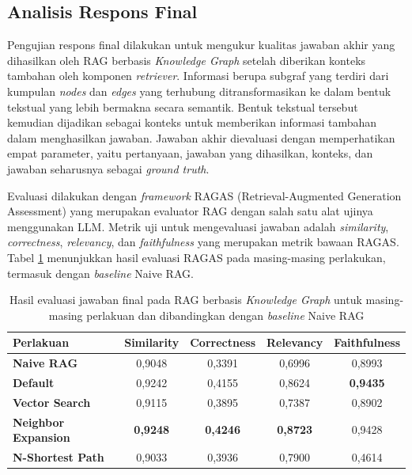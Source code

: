 \subsection{Analisis Respons Final}
Pengujian respons final dilakukan untuk mengukur kualitas jawaban akhir yang dihasilkan oleh RAG berbasis \textit{Knowledge Graph} setelah diberikan konteks tambahan oleh komponen \textit{retriever}.
Informasi berupa subgraf yang terdiri dari kumpulan \textit{nodes} dan \textit{edges} yang terhubung ditransformasikan ke dalam bentuk tekstual yang lebih bermakna secara semantik.
Bentuk tekstual tersebut kemudian dijadikan sebagai konteks untuk memberikan informasi tambahan dalam menghasilkan jawaban.
Jawaban akhir dievaluasi dengan memperhatikan empat parameter, yaitu pertanyaan, jawaban yang dihasilkan, konteks, dan jawaban seharusnya sebagai \textit{ground truth}.

Evaluasi dilakukan dengan \textit{framework} RAGAS (Retrieval-Augmented Generation Assessment) yang merupakan evaluator RAG dengan salah satu alat ujinya menggunakan LLM.
Metrik uji untuk mengevaluasi jawaban adalah \textit{similarity}, \textit{correctness}, \textit{relevancy}, dan \textit{faithfulness} yang merupakan metrik bawaan RAGAS.
Tabel \ref{tab:final-answer-evaluation-result} menunjukkan hasil evaluasi RAGAS pada masing-masing perlakukan, termasuk dengan \textit{baseline} Naive RAG.

\begin{table}[H]
	\centering
	\caption{Hasil evaluasi jawaban final pada RAG berbasis \textit{Knowledge Graph} untuk masing-masing perlakuan dan dibandingkan dengan \textit{baseline} Naive RAG}
	\label{tab:final-answer-evaluation-result}
	\begin{tabular}{|l|c|c|c|c|}
		\hline
		\textbf{Perlakuan}          & \textbf{Similarity} & \textbf{Correctness} & \textbf{Relevancy} & \textbf{Faithfulness} \\
		\hline \hline
		\textbf{Naive RAG}          & 0,9048              & 0,3391               & 0,6996             & 0,8993                \\
		\hline
		\textbf{Default}            & 0,9242              & 0,4155               & 0,8624             & \textbf{0,9435}       \\
		\hline
		\textbf{Vector Search}      & 0,9115              & 0,3895               & 0,7387             & 0,8902                \\
		\hline
		\textbf{Neighbor Expansion} & \textbf{0,9248}     & \textbf{0,4246}      & \textbf{0,8723}    & 0,9428                \\
		\hline
		\textbf{N-Shortest Path}    & 0,9033              & 0,3936               & 0,7900             & 0,4614                \\
		\hline
	\end{tabular}
\end{table}

